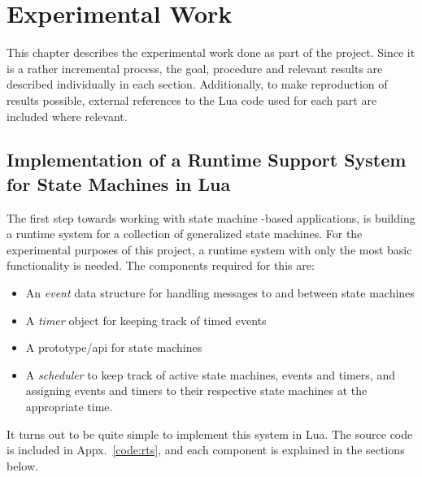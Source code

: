 \chapter{Experimental Work}
\label{ch:experimental_work}
This chapter describes the experimental work done as part of the project. Since it is a rather incremental process, the goal, procedure and relevant results are described individually in each section. Additionally, to make reproduction of results possible, external references to the Lua code used for each part are included where relevant.

\section{Implementation of a Runtime Support System for State Machines in Lua}
\label{sec:impl_runtime_support}
The first step towards working with state machine -based applications, is building a runtime system for a collection of generalized state machines. For the experimental purposes of this project, a runtime system with only the most basic functionality is needed. The components required for this are:

\begin{itemize}
	\item An \emph{event} data structure for handling messages to and between state machines
	\item A \emph{timer} object for keeping track of timed events
	\item A prototype/\gls{api} for state machines
	\item A \emph{scheduler} to keep track of active state machines, events and timers, and assigning events and timers to their respective state machines at the appropriate time.
\end{itemize}

It turns out to be quite simple to implement this system in Lua. The source code is included in Appx.~\ref{code:rts}, and each component is explained in the sections below.

